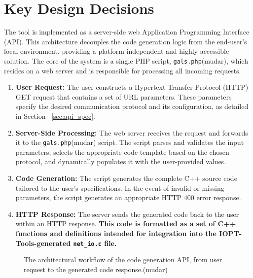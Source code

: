 
\section{Key Design Decisions}
\label{sec:design_decisions}

The tool is implemented as a server-side web Application Programming Interface (API). This architecture decouples the code generation logic from the end-user's local environment, providing a platform-independent and highly accessible solution. The core of the system is a single PHP script, \texttt{gals.php}(mudar), which resides on a web server and is responsible for processing all incoming requests.



\begin{enumerate}
    \item \textbf{User Request:} The user constructs a Hypertext Transfer Protocol (HTTP) GET request that contains a set of URL parameters. These parameters specify the desired communication protocol and its configuration, as detailed in Section ~\ref{sec:api_spec}.
    \item \textbf{Server-Side Processing:} The web server receives the request and forwards it to the \texttt{gals.php}(mudar) script. The script parses and validates the input parameters, selects the appropriate code template based on the chosen protocol, and dynamically populates it with the user-provided values.
    \item \textbf{Code Generation:} The script generates the complete C++ source code tailored to the user's specifications. In the event of invalid or missing parameters, the script generates an appropriate HTTP 400 error response.
    \item \textbf{HTTP Response:} The server sends the generated code back to the user within an HTTP response. \textbf{This code is formatted as a set of C++ functions and definitions intended for integration into the IOPT-Tools-generated \texttt{net\_io.c} file.}
\end{enumerate}

\begin{figure}[h!]
    \centering
    
    \caption{The architectural workflow of the code generation API, from user request to the generated code response.(mudar)}
    \label{fig:api_workflow}
\end{figure}


